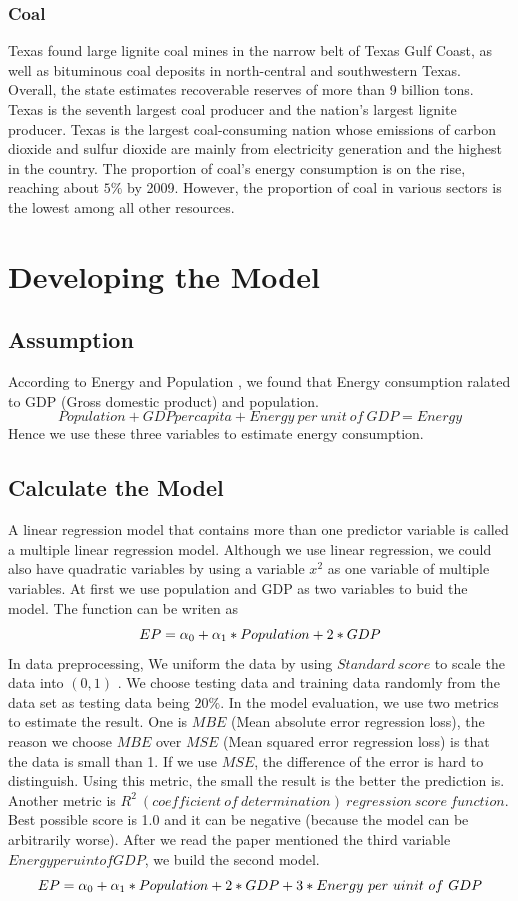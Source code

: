 \documentclass{mcmthesis}
\begin{document}
\subsubsection{Coal}
  Texas found large lignite coal mines in the narrow belt of Texas Gulf Coast, as well as bituminous coal deposits in north-central
  and southwestern Texas. Overall, the state estimates recoverable reserves of more than 9 billion tons.
  Texas is the seventh largest coal producer and the nation's largest lignite producer. Texas is the largest coal-consuming nation
  whose emissions of carbon dioxide and sulfur dioxide are mainly from electricity generation and the highest in the country.
  The proportion of coal's energy consumption is on the rise, reaching about $5\%$ by 2009. However, the proportion of coal in
  various sectors is the lowest among all other resources.

\section{Developing the Model}
\subsection{Assumption}
According to Energy and Population \cite{2},
we found that Energy consumption ralated to GDP (Gross domestic product) and population.
$$Population + GDP per capita + Energy\ per\ unit\ of\ GDP = Energy$$
Hence we use these three variables to estimate energy consumption.
\subsection{Calculate the Model}
A linear regression model that contains more than one predictor variable is called a multiple linear regression model\cite{3}.
Although we use linear regression, we could also have quadratic variables by using a variable $x^2$  as one variable of multiple variables.
At first we use population and GDP as two variables to buid the model. The function can be writen as
$$EP = \alpha_0 + \alpha_1 * Population + \label_2 * GDP $$
In data preprocessing, We uniform the data by using $Standard\ score$ \cite{4}
to scale the data into $(0,1)$ .
We choose testing data and training data randomly from the data set as testing data being $20\%$. In the model evaluation, we use two metrics to estimate the result.
One is $MBE$ (Mean absolute error regression loss), the reason we choose $MBE$ over $MSE$ (Mean squared error regression loss) is that the data is small than 1.
If we use $MSE$, the difference of the error is hard to distinguish. Using this metric, the small the result is the better the prediction is.
Another metric is $R^2\ (coefficient\ of\ determination)\ regression\ score\ function$.
Best possible score is 1.0 and it can be negative (because the model can be arbitrarily worse).
After we read the paper mentioned the third variable $Energy per uint of GDP$, we build the second model.
$$EP = \alpha_0 + \alpha_1 * Population + \label_2 * GDP + \label_3 * Energy\ per\ uinit\ of\ GDP $$
\end{document}
